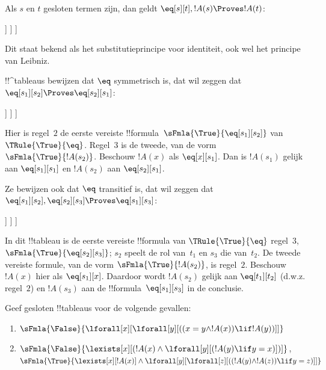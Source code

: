 \documentclass[../../../include/open-logic-section]{subfiles}
\begin{document}
\begin{ex}
Als $s$ en $t$ gesloten termen zijn, dan geldt
$\eq[s][t], !A(s) \Proves !A(t)$:
\begin{oltableau}
  [\sFmla{\False}{\formula{A}(t)}, just = \TAss
    [\sFmla{\True}{\eq[s][t]}, just = \TAss
      [\sFmla{\True}{\formula{A}(s)}, just = \TAss
        [\sFmla{\True}{\formula{A}(t)}, just={\TRule{\True}{\eq}[2, 3]}, close]
      ]
    ]
  ]
\end{oltableau}
Dit staat bekend als het substitutieprincipe voor identiteit, ook wel
het principe van Leibniz.

!!^{tableau}s bewijzen dat $\eq$ symmetrisch is, dat wil zeggen dat
$\eq[s_1][s_2] \Proves \eq[s_2][s_1]$:
\begin{oltableau}
  [\sFmla{\False}{\eq[s_2][s_1]}, just = \TAss
    [\sFmla{\True}{\eq[s_1][s_2]}, just = \TAss
      [\sFmla{\True}{\eq[s_1][s_1]}, just = {$\eq$}
        [\sFmla{\True}{\eq[s_2][s_1]}, just = {\TRule{\True}{\eq}[2, 3]}, close]
      ]
    ]
  ]
\end{oltableau}
Hier is regel~$2$ de eerste vereiste
!!{formula}~$\sFmla{\True}{\eq[s_1][s_2]}$ van
$\TRule{\True}{\eq}$. Regel~$3$ is de tweede, van de vorm
$\sFmla{\True}{!A(s_2)}$. Beschouw $!A(x)$ als $\eq[x][s_1]$. Dan is
$!A(s_1)$ gelijk aan $\eq[s_1][s_1]$ en $!A(s_2)$ aan
$\eq[s_2][s_1]$.

Ze bewijzen ook dat $\eq$ transitief is, dat wil zeggen dat
$\eq[s_1][s_2], \eq[s_2][s_3] \Proves \eq[s_1][s_3]$:
\begin{oltableau}
  [\sFmla{\False}{\eq[s_1][s_3]}, just = \TAss
    [\sFmla{\True}{\eq[s_1][s_2]}, just = \TAss
      [\sFmla{\True}{\eq[s_2][s_3]}, just = \TAss
        [\sFmla{\True}{\eq[s_1][s_3]}, just = {\TRule{\True}{\eq}[3, 2]}, close]
      ]
    ]
  ]
\end{oltableau}
In dit !!{tableau} is de eerste vereiste !!{formula} van
$\TRule{\True}{\eq}$ regel~$3$,
$\sFmla{\True}{\eq[s_2][s_3]}$; $s_2$ speelt de rol van~$t_1$ en
$s_3$ die van~$t_2$. De tweede vereiste formule, van de vorm
$\sFmla{\True}{!A(s_2)}$, is regel~$2$. Beschouw $!A(x)$ hier als
$\eq[s_1][x]$. Daardoor wordt $!A(s_2)$ gelijk aan
$\eq[t_1][t_2]$ (d.w.z. regel~$2$) en $!A(s_3)$ aan de
!!{formula}~$\eq[s_1][s_3]$ in de conclusie.
\end{ex}

\begin{prob}
Geef gesloten !!{tableau}s voor de volgende gevallen:
\begin{enumerate}
\item $\sFmla{\False}{\lforall[x][\lforall[y][((x = y \land !A(x))
      \lif !A(y))]]}$
\item $\sFmla{\False}{\lexists[x][(!A(x) \land
    \lforall[y][(!A(y) \lif y = x)])]}$,\\
  $\sFmla{\True}{\lexists[x][!A(x)] \land
    \lforall[y][\lforall[z][((!A(y) \land !A(z)) \lif y = z)]]}$
\end{enumerate}
\end{prob}
\end{document}
